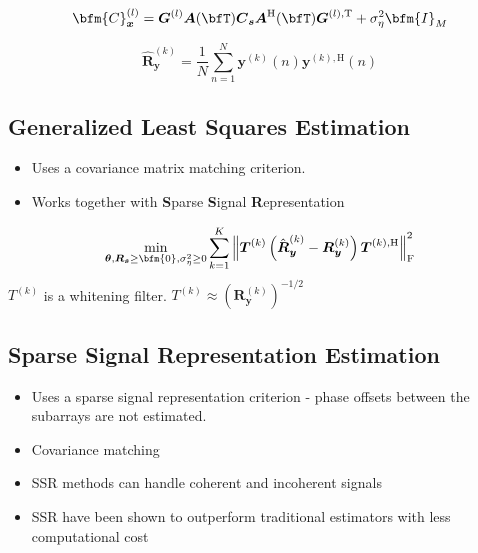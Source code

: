 \begin{equation}
\bfm{C}_{\boldsymbol{x}}^{(l)}=\boldsymbol{G}^{(l)} \boldsymbol{A}(\bfT) \boldsymbol{C}_{\boldsymbol{s}} \boldsymbol{A}^{\mathrm{H}}(\bfT) \boldsymbol{G}^{(l), \mathrm{T}}+\sigma_\eta^2 \bfm{I}_M
\end{equation}


\begin{equation}
\hat{\boldsymbol{R}}_{\boldsymbol{y}}^{(k)}=\frac{1}{N} \sum_{n=1}^N \boldsymbol{y}^{(k)}(n) \boldsymbol{y}^{(k), \mathrm{H}}(n)
\label{eq:sub_sample_covariance}
\end{equation}

\subsection{Generalized Least Squares Estimation}
\begin{itemize}
    \item Uses a covariance matrix matching criterion.
    \item Works together with \textbf{S}parse \textbf{S}ignal \textbf{R}epresentation
\end{itemize}

\begin{equation}
    \min _{\boldsymbol{\theta}, \boldsymbol{R}_{\boldsymbol{s}} \geq \bfm{0}, \sigma_\eta^2 \geq 0} \sum_{k=1}^K\left\|\boldsymbol{T}^{(k)}\left(\hat{\boldsymbol{R}}_{\boldsymbol{y}}^{(k)}-\boldsymbol{R}_{\boldsymbol{y}}^{(k)}\right) \boldsymbol{T}^{(k), \mathrm{H}}\right\|_{\mathrm{F}}^2
\end{equation}
\( T^{(k)} \) is a whitening filter. \( T^{(k)} \approx \left(\boldsymbol{R}_{\boldsymbol{y}}^{(k)}\right)^{-1 / 2} \)\\

\subsection{Sparse Signal Representation Estimation}
\begin{itemize}
    \item Uses a sparse signal representation criterion - phase offsets between the subarrays are not estimated.
    \item Covariance matching
    \item SSR methods can handle coherent and incoherent signals
    \item SSR have been shown to outperform traditional estimators with less computational cost
\end{itemize}


